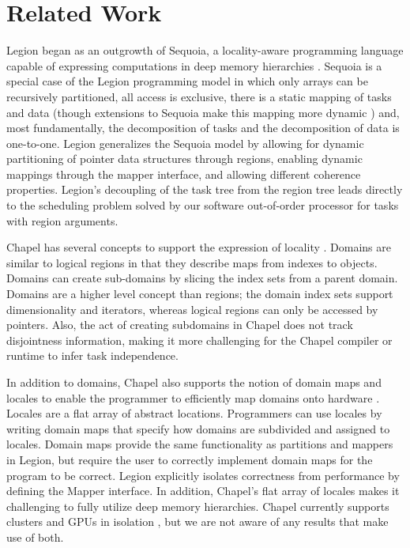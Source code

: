 
\section{Related Work}
\label{sec:related}

Legion began as an outgrowth of Sequoia, a locality-aware programming language capable
of expressing computations in deep memory hierarchies
\cite{Fatahalian06}.  Sequoia is a special case of the Legion
programming model in which only arrays can be recursively partitioned,
all access is exclusive, there is a static mapping of tasks and data (though
extensions to Sequoia make this mapping more dynamic \cite{BCSA11}) and, most fundamentally, the decomposition of tasks and the decomposition
of data is one-to-one.  Legion generalizes the Sequoia model by allowing for
dynamic partitioning of pointer data structures through regions, enabling dynamic mappings through
the mapper interface, and allowing different coherence
properties.  Legion's decoupling of the task tree from the region tree leads directly to the scheduling problem solved by our software out-of-order processor for tasks with region arguments.

Chapel has several concepts to support the expression of locality \cite{Chamberlain:Chapel}.
Domains are similar to logical regions in that they describe maps from indexes
to objects.  Domains can create sub-domains by slicing the index sets from
a parent domain.  Domains are a higher level concept than regions; the domain index sets 
support dimensionality and iterators, whereas logical regions can only be accessed by pointers.  
Also, the act of creating subdomains in Chapel does not track disjointness information,
making it more challenging for the Chapel compiler or runtime to infer task independence.

In addition to domains, Chapel also supports the notion of domain maps and locales to enable 
the programmer to efficiently map domains onto hardware \cite{CHAPEL11}.  Locales are a flat array
of abstract locations.  Programmers can use locales by writing domain maps that specify
how domains are subdivided and assigned to locales.  Domain maps provide the same functionality
as partitions and mappers in Legion, but require the user to correctly implement domain
maps for the program to be correct.  Legion explicitly isolates correctness
from performance by defining the Mapper interface.  In addition, Chapel's flat array of locales
makes it challenging to fully utilize deep memory hierarchies.  Chapel currently supports
clusters and GPUs in isolation \cite{CHAPELGPU}, but we are not aware of any results that 
make use of both.

